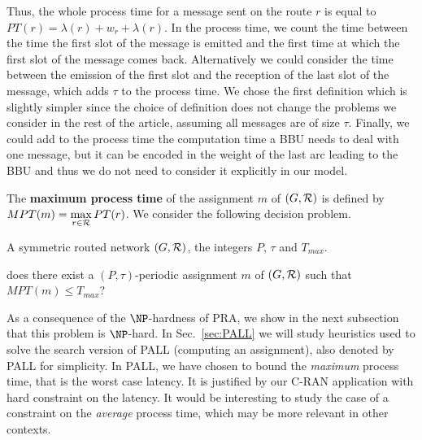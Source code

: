 \documentclass[10pt, conference, letterpaper]{IEEEtran}
\begin{document}
      Thus, the whole process time for a message sent on the route $r$ is equal to
      $PT(r)=\lambda(r)+ w_r+\lambda(r)$.      
      In the process time, we count the time between the time the first slot of the message is emitted and the first time at which the first slot of the message comes back. Alternatively we could consider the time between the emission of the first slot and the reception of the last slot of the message, which adds $\tau$ to the process time.
      We chose the first definition which is slightly simpler since the choice of definition does not change the problems we consider in the rest of the article, assuming all messages are of size $\tau$.
      Finally, we could add to the process time the computation time a BBU needs to deal with one message, but it can be encoded  in the weight of the last arc leading to the BBU and thus we do not need to consider it explicitly in our model.
      
      
    The {\bf maximum process time} of the assignment $m$ of $(G,{\cal R})$ is defined by $MPT(m)=\max\limits_{r \in {\cal R}} PT(r)$. We consider the following decision problem.


        A symmetric routed network $(G,{\cal R})$, the integers $P$, $\tau$ and $T_{max}$.

       does there exist a $(P,\tau)$-periodic assignment $m$ of $(G,{\cal R})$ such that $MPT(m) \leq T_{max}$?

      As a consequence of the $\NP$-hardness of PRA, we show in the next subsection that this problem is $\NP$-hard. 
      In Sec.~\ref{sec:PALL} we will study heuristics used to solve the search version of PALL (computing an assignment), also denoted by PALL for simplicity. In PALL, we have chosen to bound the \emph{maximum} process time, that is the worst case latency. It is justified by our C-RAN application with hard constraint on the latency. It would be interesting to study the case of a constraint on the \emph{average} process time, which may be more relevant in other contexts.
\end{document}
